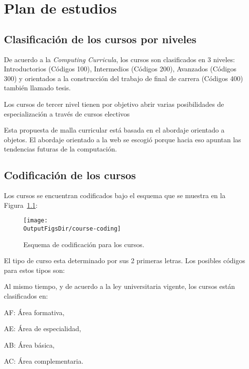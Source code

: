 \chapter{Plan de estudios \YYYY}\label{chap:GeneralInfo}

\section{Clasificación de los cursos por niveles}
De acuerdo a la \textit{Computing Curricula}, los cursos son clasificados en 3 niveles: Introductorios (Códigos 100), 
Intermedios  (Códigos 200), Avanzados  (Códigos 300) y orientados a la construcción del trabajo de final de carrera  (Códigos 400) también llamado tesis.

Los cursos de tercer nivel tienen por objetivo abrir varias posibilidades de especialización a través de cursos electivos

Esta propuesta de malla curricular está basada en el abordaje orientado a objetos. 
El abordaje orientado a la web se escogió porque hacia eso apuntan las tendencias 
futuras de la computación.

\section{Codificación de los cursos}
Los cursos se encuentran codificados bajo el esquema que se muestra en la Figura~\ref{fig:course-number}:

\begin{figure}[ht]
   \centering
   \texttt{[image: \\OutputFigsDir/course-coding]}
   \caption{Esquema de codificación para los cursos.}
   \label{fig:course-number}
\end{figure}

El tipo de curso esta determinado por sus 2 primeras letras. Los posibles códigos para estos tipos son:


Al mismo tiempo, y de acuerdo a la ley universitaria vigente, los cursos están clasificados en:
\begin{inparadesc}
\item [AF:] Área formativa,
\item [AE:] Área de especialidad,
\item [AB:] Área básica,
\item [AC:] Área complementaria.
\end{inparadesc}




